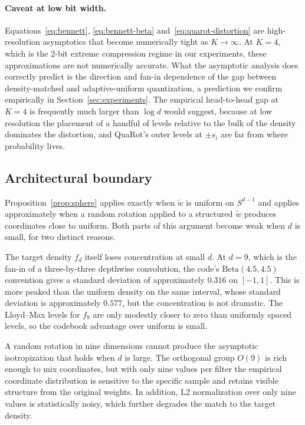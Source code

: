 \paragraph{Caveat at low bit width.}
Equations~\ref{eq:bennett}, \ref{eq:bennett-beta}
and~\ref{eq:quarot-distortion} are high-resolution asymptotics that
become numerically tight as $K \to \infty$. At $K = 4$, which is the
2-bit extreme compression regime in our experiments, these
approximations are not numerically accurate. What the asymptotic
analysis does correctly predict is the direction and fan-in dependence
of the gap between density-matched and adaptive-uniform quantization, a
prediction we confirm empirically in Section~\ref{sec:experiments}.
The empirical head-to-head gap at $K = 4$ is frequently much larger
than $\log d$ would suggest, because at low resolution the placement of
a handful of levels relative to the bulk of the density dominates the
distortion, and QuaRot's outer levels at $\pm s_i$ are far from where
probability lives.

\subsection{Architectural boundary}
\label{sec:method-boundary}

Proposition~\ref{prop:sphere} applies exactly when $\widetilde{w}$ is
uniform on $S^{d-1}$ and applies approximately when a random rotation
applied to a structured $\widetilde{w}$ produces coordinates close to
uniform. Both parts of this argument become weak when $d$ is small, for
two distinct reasons.

The target density $f_d$ itself loses concentration at small $d$. At
$d = 9$, which is the fan-in of a three-by-three depthwise convolution,
the code's $\mathrm{Beta}(4.5, 4.5)$ convention gives a standard deviation
of approximately $0.316$ on $[-1, 1]$. This is more peaked than the
uniform density on the same interval, whose standard deviation is
approximately $0.577$, but the concentration is not dramatic. The
Lloyd--Max levels for $f_9$ are only modestly closer to zero than
uniformly spaced levels, so the codebook advantage over uniform is small.

A random rotation in nine dimensions cannot produce the asymptotic
isotropization that holds when $d$ is large. The orthogonal group
$O(9)$ is rich enough to mix coordinates, but with only nine values per
filter the empirical coordinate distribution is sensitive to the specific
sample and retains visible structure from the original weights. In
addition, L2 normalization over only nine values is statistically noisy,
which further degrades the match to the target density.

